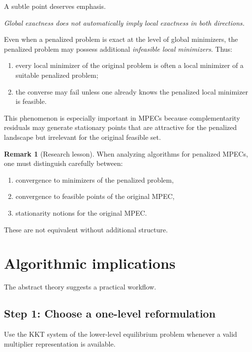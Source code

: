 \documentclass[pdflatex,sn-mathphys-num]{sn-jnl}%
\theoremstyle{definition}
\newtheorem{remark}[theorem]{Remark}
\begin{document}
A subtle point deserves emphasis.

\begin{center}
\emph{Global exactness does not automatically imply local exactness in both directions.}
\end{center}

Even when a penalized problem is exact at the level of global minimizers, the penalized problem may possess additional \emph{infeasible local minimizers}. Thus:

\begin{enumerate}[label=(\roman*)]
    \item every local minimizer of the original problem is often a local minimizer of a suitable penalized problem;
    \item the converse may fail unless one already knows the penalized local minimizer is feasible.
\end{enumerate}

This phenomenon is especially important in MPECs because complementarity residuals may generate stationary points that are attractive for the penalized landscape but irrelevant for the original feasible set.

\begin{remark}[Research lesson]
When analyzing algorithms for penalized MPECs, one must distinguish carefully between:
\begin{enumerate}[label=(\roman*)]
    \item convergence to minimizers of the penalized problem,
    \item convergence to feasible points of the original MPEC,
    \item stationarity notions for the original MPEC.
\end{enumerate}
These are not equivalent without additional structure.
\end{remark}

\section{Algorithmic implications}

The abstract theory suggests a practical workflow.

\subsection*{Step 1: Choose a one-level reformulation}
Use the KKT system of the lower-level equilibrium problem whenever a valid multiplier representation is available.
\end{document}
